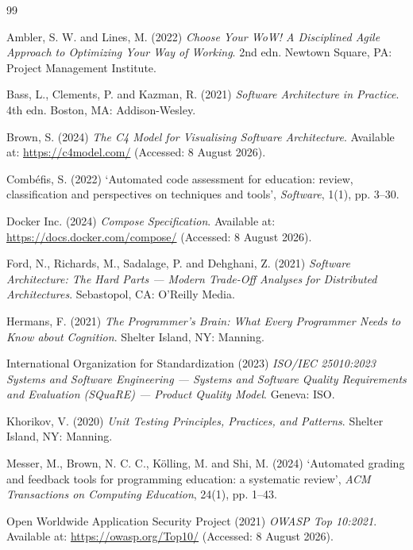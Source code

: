 \documentclass[a4paper,11pt]{article}
\begin{document}
\begin{thebibliography}{99}
\setlength{\itemsep}{5pt}

Ambler, S. W. and Lines, M. (2022) \textit{Choose Your WoW! A Disciplined Agile
Approach to Optimizing Your Way of Working}. 2nd edn. Newtown Square, PA:
Project Management Institute.

Bass, L., Clements, P. and Kazman, R. (2021) \textit{Software Architecture in
Practice}. 4th edn. Boston, MA: Addison-Wesley.

Brown, S. (2024) \textit{The C4 Model for Visualising Software Architecture}.
Available at: \url{https://c4model.com/} (Accessed: 8 August 2026).

Comb\'{e}fis, S. (2022) `Automated code assessment for education: review,
classification and perspectives on techniques and tools', \textit{Software},
1(1), pp. 3--30.

Docker Inc. (2024) \textit{Compose Specification}. Available at:
\url{https://docs.docker.com/compose/} (Accessed: 8 August 2026).

Ford, N., Richards, M., Sadalage, P. and Dehghani, Z. (2021) \textit{Software
Architecture: The Hard Parts --- Modern Trade-Off Analyses for Distributed
Architectures}. Sebastopol, CA: O'Reilly Media.

Hermans, F. (2021) \textit{The Programmer's Brain: What Every Programmer Needs
to Know about Cognition}. Shelter Island, NY: Manning.

International Organization for Standardization (2023) \textit{ISO/IEC
25010:2023 Systems and Software Engineering --- Systems and Software Quality
Requirements and Evaluation (SQuaRE) --- Product Quality Model}. Geneva: ISO.

Khorikov, V. (2020) \textit{Unit Testing Principles, Practices, and Patterns}.
Shelter Island, NY: Manning.

Messer, M., Brown, N. C. C., K\"{o}lling, M. and Shi, M. (2024) `Automated
grading and feedback tools for programming education: a systematic review',
\textit{ACM Transactions on Computing Education}, 24(1), pp. 1--43.

Open Worldwide Application Security Project (2021) \textit{OWASP Top 10:2021}.
Available at: \url{https://owasp.org/Top10/} (Accessed: 8 August 2026).


\end{thebibliography}
\end{document}
